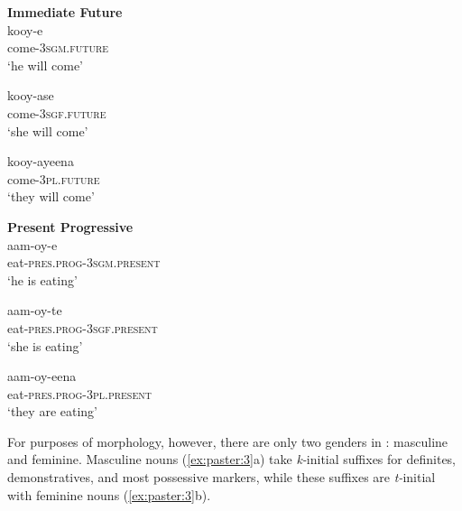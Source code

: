 \documentclass[output=paper,modfonts]{langscibook}
\begin{document}
\begin{exe}
\sn%
\parbox[t]{.8\textwidth}{
      \vspace{-.9\baselineskip} 
\begin{xlist}
\setcounter{xnumii}{2}
\parbox{.3\textwidth}{
\ex    \textbf{Immediate Future\vphantom{j}}  \\
\gll kooy-e   \\     
  come-\textsc{3sgm.future}         \\
 \glt ‘he will come’  

 \medskip
\gll kooy-ase    \\
  come-\textsc{3sgf.future}         \\
 \glt ‘she will come’   

\medskip
\gll kooy-ayeena \\
come-\textsc{3pl.future}            \\
 \glt ‘they will come’  
}
\parbox{.4\textwidth}{
 \ex
  \textbf{Present Progressive}\\ 
 \gll aam-oy-e \\
 eat-\textsc{pres.prog-3sgm.present}\\
 \glt ‘he is eating’

 \medskip
\gll  aam-oy-te \\
  eat-\textsc{pres.prog-3sgf.present}\\
 \glt ‘she is eating’

 \medskip
\gll  aam-oy-eena  \\
   eat-\textsc{pres.prog-3pl.present}\\
\glt  ‘they are eating’
}
\end{xlist}
}
\end{exe}


For purposes of  morphology, however, there are only two genders in : masculine and feminine. Masculine nouns (\ref{ex:paster:3}a) take \textit{k-}initial suffixes for definites, demonstratives, and most possessive markers, while these suffixes are \textit{t-}initial\textit{} with feminine nouns (\ref{ex:paster:3}b). 
\end{document}
